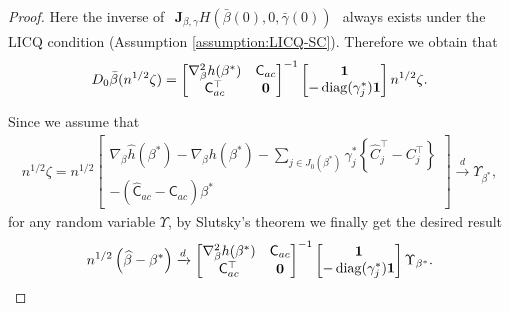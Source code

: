 \begin{proof}
Here the inverse of $\begin{matrix}
\bm{J}_{\beta,\gamma} H(\bar{\beta}(0), 0, \bar{\gamma}(0))
\end{matrix}$ always exists under the LICQ condition (Assumption \ref{assumption:LICQ-SC}). Therefore we obtain that
\begin{align*}
    D_0\bar{\beta}(n^{1/2}\zeta) = \begin{bmatrix}
        \nabla^2_{\beta}h(\beta^*) & \mathsf{C}_{ac} \\
        \mathsf{C}^\top_{ac} & \bm{0}
        \end{bmatrix}^{-1} \begin{bmatrix}
        \bm{1} \\
        -\operatorname{diag}(\gamma^*_j)\bm{1}
        \end{bmatrix} n^{1/2}\zeta.
\end{align*}


Since we assume that
\begin{align*}
    n^{1/2}\zeta = n^{1/2}\begin{bmatrix}
    \nabla_\beta\widehat{h}(\beta^*) - \nabla_\beta h(\beta^*) - \sum_{j \in J_0(\beta^*)}\gamma^*_j\left\{ \widehat{C}_j^\top - C_j^\top \right\} \\
    -(\widehat{\mathsf{C}}_{ac} - \mathsf{C}_{ac})\beta^*
    \end{bmatrix} \xrightarrow{d} \Upsilon_{\beta^*},
\end{align*}
for any random variable $\Upsilon$, by Slutsky's theorem we finally get the desired result
\begin{align*}
    n^{1/2}\left(\widehat{\beta} - \beta^* \right) \xrightarrow{d} \begin{bmatrix}
        \nabla^2_{\beta}h(\beta^*) & \mathsf{C}_{ac} \\
        \mathsf{C}^\top_{ac} & \bm{0}
        \end{bmatrix}^{-1} \begin{bmatrix}
        \bm{1} \\
        -\operatorname{diag}(\gamma^*_j)\bm{1}
        \end{bmatrix} \Upsilon_{\beta^*}.
\end{align*}


\end{proof}



